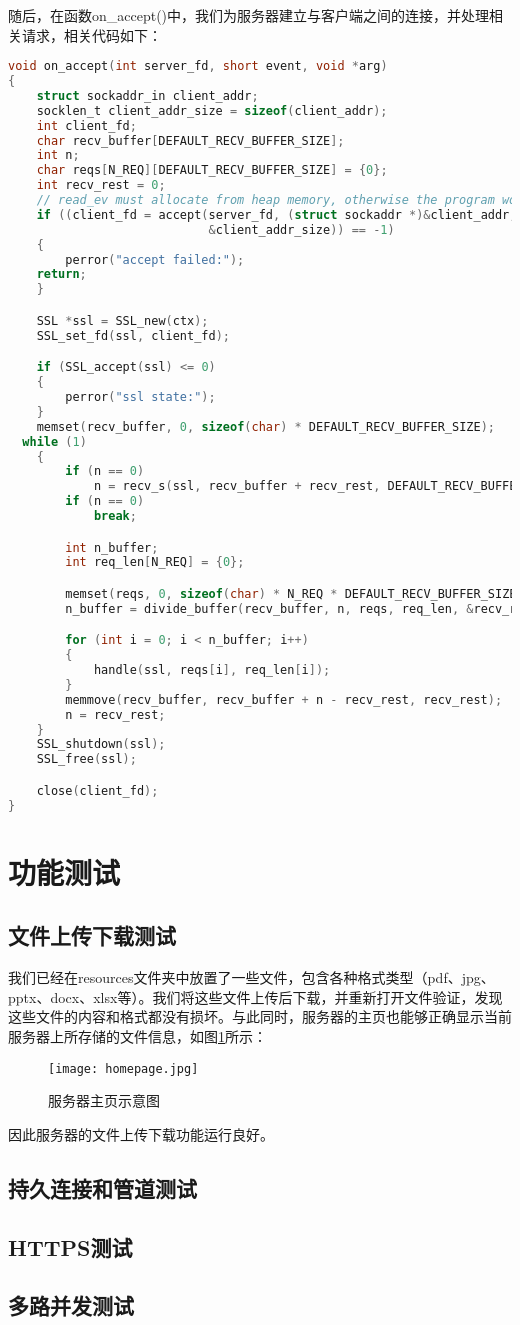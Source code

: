\documentclass[a4paper]{article}
\begin{document}
随后，在函数on\_accept()中，我们为服务器建立与客户端之间的连接，并处理相关请求，相关代码如下：
\begin{lstlisting}[language=C, title=server.c]
  void on_accept(int server_fd, short event, void *arg) 
{
	struct sockaddr_in client_addr;
	socklen_t client_addr_size = sizeof(client_addr);
	int client_fd;
	char recv_buffer[DEFAULT_RECV_BUFFER_SIZE];
	int n;
	char reqs[N_REQ][DEFAULT_RECV_BUFFER_SIZE] = {0};
	int recv_rest = 0;
	// read_ev must allocate from heap memory, otherwise the program would crash from segmant fault
	if ((client_fd = accept(server_fd, (struct sockaddr *)&client_addr,
							&client_addr_size)) == -1)
	{
		perror("accept failed:");
    return;
	}

	SSL *ssl = SSL_new(ctx);
	SSL_set_fd(ssl, client_fd);

	if (SSL_accept(ssl) <= 0)
	{
		perror("ssl state:");
	}
	memset(recv_buffer, 0, sizeof(char) * DEFAULT_RECV_BUFFER_SIZE);
  while (1)
	{
		if (n == 0)
			n = recv_s(ssl, recv_buffer + recv_rest, DEFAULT_RECV_BUFFER_SIZE - recv_rest, 0);
		if (n == 0)
			break;

		int n_buffer;
		int req_len[N_REQ] = {0};

		memset(reqs, 0, sizeof(char) * N_REQ * DEFAULT_RECV_BUFFER_SIZE);
		n_buffer = divide_buffer(recv_buffer, n, reqs, req_len, &recv_rest);

		for (int i = 0; i < n_buffer; i++)
		{
			handle(ssl, reqs[i], req_len[i]);
		}
		memmove(recv_buffer, recv_buffer + n - recv_rest, recv_rest);
		n = recv_rest;
	}
	SSL_shutdown(ssl);
	SSL_free(ssl);

	close(client_fd);
}

\end{lstlisting}

\section{功能测试}
\subsection{文件上传下载测试}
我们已经在resources文件夹中放置了一些文件，包含各种格式类型（pdf、jpg、pptx、docx、xlsx等）。我们将这些文件上传后下载，并重新打开文件验证，发现这些文件的内容和格式都没有损坏。与此同时，服务器的主页也能够正确显示当前服务器上所存储的文件信息，如图\ref{fig:homepage}所示：
\begin{figure}[!h]
  \centering
  \texttt{[image: homepage.jpg]}
  \caption{服务器主页示意图}
  \label{fig:homepage}
\end{figure}

因此服务器的文件上传下载功能运行良好。
\subsection{持久连接和管道测试}

\subsection{HTTPS测试}

\subsection{多路并发测试}
\end{document}
